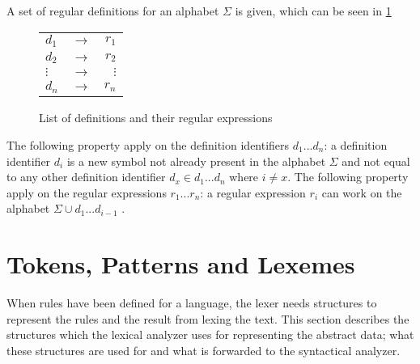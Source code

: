 A set of regular definitions for an alphabet $\Sigma$ is given, which can be
seen in \cref{fig:regularDefinitions}

\begin{figure}[hb!]
\begin{center}
\begin{tabular}{l c r}
$d_1$ & $\to$ & $r_1$\\
$d_2$ & $\to$ & $r_2$\\
$\vdots$ & $\to$ & $\vdots$\\
$d_n$ & $\to$ & $r_n$\\
\end{tabular}
\caption{List of definitions and their regular expressions \label{fig:regularDefinitions}}
\end{center}
\end{figure}

The following property apply on the definition identifiers $d_1 ... d_n$: a
definition identifier $d_i$ is a new symbol not already present in the alphabet
$\Sigma$ and not equal to any other definition identifier
$d_x \in {d_1 ... d_n}$ where $i \neq x$.
The following property apply on the regular expressions $r_1 ... r_n$: a regular
expression $r_i$ can work on the alphabet $\Sigma \cup {d_1 ... d_{i-1}}$
\cite{Aho2006}.

\section{Tokens, Patterns and Lexemes}
When rules have been defined for a language, the lexer needs structures to
represent the rules and the result from lexing the text.
This section describes the structures which the lexical analyzer uses
for representing the abstract data; what these structures are used for and what is
forwarded to the syntactical analyzer.

